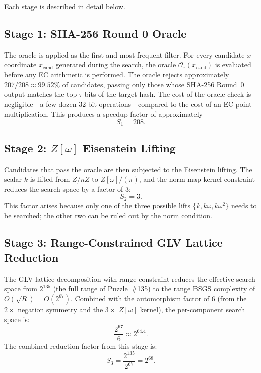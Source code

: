 \documentclass[11pt,a4paper]{article}
\theoremstyle{definition}
\begin{document}
Each stage is described in detail below.

\subsection{Stage 1: SHA-256 Round 0 Oracle}

The oracle is applied as the first and most frequent filter. For every candidate $x$-coordinate $x_{\mathrm{cand}}$ generated during the search, the oracle $\mathcal{O}_{\tau}(x_{\mathrm{cand}})$ is evaluated before any EC arithmetic is performed. The oracle rejects approximately $207/208 \approx 99.52\%$ of candidates, passing only those whose SHA-256 Round~0 output matches the top $\tau$ bits of the target hash. The cost of the oracle check is negligible---a few dozen 32-bit operations---compared to the cost of an EC point multiplication. This produces a speedup factor of approximately
\begin{equation}
  S_1 = 208.
\end{equation}

\subsection{Stage 2: $Z[\omega]$ Eisenstein Lifting}

Candidates that pass the oracle are then subjected to the Eisenstein lifting. The scalar $k$ is lifted from $Z/nZ$ to $Z[\omega]/(\pi)$, and the norm map kernel constraint reduces the search space by a factor of $3$:
\begin{equation}
  S_2 = 3.
\end{equation}
This factor arises because only one of the three possible lifts $\{k, k\omega, k\omega^2\}$ needs to be searched; the other two can be ruled out by the norm condition.

\subsection{Stage 3: Range-Constrained GLV Lattice Reduction}

The GLV lattice decomposition with range constraint reduces the effective search space from $2^{135}$ (the full range of Puzzle~\#135) to the range BSGS complexity of $O(\sqrt{R}) = O(2^{67})$. Combined with the automorphism factor of $6$ (from the $2\times$ negation symmetry and the $3\times$ $Z[\omega]$ kernel), the per-component search space is:
\begin{equation}
  \frac{2^{67}}{6} \approx 2^{64.4}.
\end{equation}
The combined reduction factor from this stage is:
\begin{equation}
  S_3 = \frac{2^{135}}{2^{67}} = 2^{68}.
\end{equation}
\end{document}
